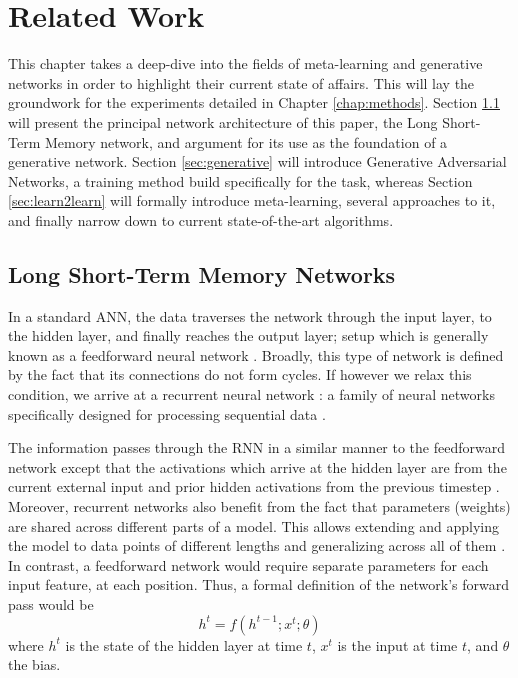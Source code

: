 \documentclass[a4paper]{book}
\begin{document}
\chapter{Related Work}\label{chap:theoretical_framework}

This chapter takes a deep-dive into the fields of meta-learning and generative networks in order to highlight their current state of affairs. This will lay the groundwork for the experiments detailed in Chapter \ref{chap:methods}. Section \ref{sec:lstm} will present the principal network architecture of this paper, the Long Short-Term Memory network, and argument for its use as the foundation of a generative network. Section \ref{sec:generative} will introduce Generative Adversarial Networks, a training method build specifically for the task, whereas Section \ref{sec:learn2learn} will formally introduce meta-learning, several approaches to it, and finally narrow down to current state-of-the-art algorithms. 

\section{Long Short-Term Memory Networks} \label{sec:lstm}

In a standard ANN, the data traverses the network through the input layer, to the hidden layer, and finally reaches the output layer; setup which is generally known as a feedforward neural network \parencite[Figure \ref{fig:feedforward_net};][]{graves_supervised_2012}. Broadly, this type of network is defined by the fact that its connections do not form cycles. If however we relax this condition, we arrive at a recurrent neural network \parencite[Figure \ref{fig:rnn_folded};][]{rumelhart_learning_1986}: a family of neural networks specifically designed for processing sequential data \parencite{goodfellow_deep_2016}.

The information passes through the RNN in a similar manner to the feedforward network except that the activations which arrive at the hidden layer are from the current external input and prior hidden activations from the previous timestep \parencite{graves_supervised_2012}. Moreover, recurrent networks also benefit from the fact that parameters (weights) are shared across different parts of a model. This allows extending and applying the model to data points of different lengths and generalizing across all of them \parencite{goodfellow_deep_2016}. In contrast, a feedforward network would require separate parameters for each input feature, at each position. Thus, a formal definition of the network's forward pass would be
\begin{equation}
    h^t = f(h^{t-1}; x^t; \theta) \label{eq:rnn_hidden}
\end{equation}
where $h^t$ is the state of the hidden layer at time $t$, $x^t$ is the input at time $t$, and $\theta$ the bias.
\end{document}

